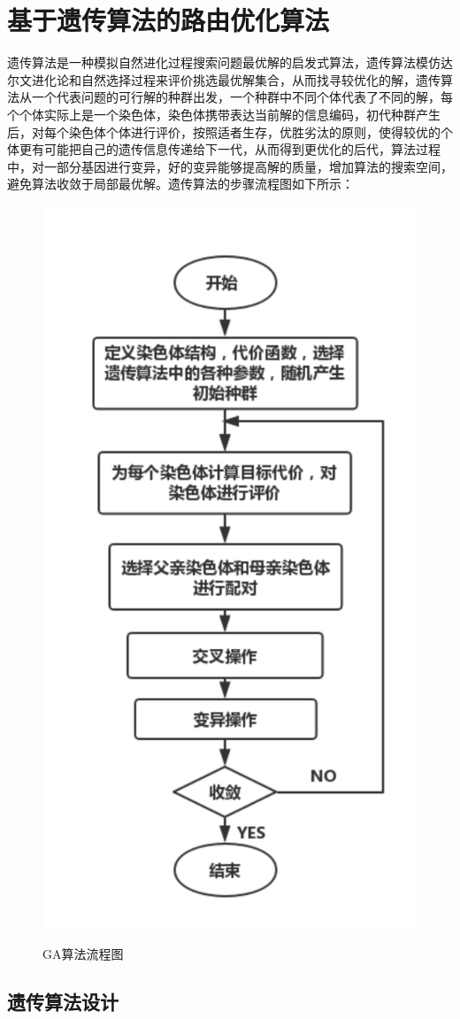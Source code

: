 \section{基于遗传算法的路由优化算法}
	遗传算法是一种模拟自然进化过程搜索问题最优解的启发式算法，遗传算法模仿达尔文进化论和自然选择过程来评价挑选最优解集合，从而找寻较优化的解，遗传算法从一个代表问题的可行解的种群出发，一个种群中不同个体代表了不同的解，每个个体实际上是一个染色体，染色体携带表达当前解的信息编码，初代种群产生后，对每个染色体个体进行评价，按照适者生存，优胜劣汰的原则，使得较优的个体更有可能把自己的遗传信息传递给下一代，从而得到更优化的后代，算法过程中，对一部分基因进行变异，好的变异能够提高解的质量，增加算法的搜索空间，避免算法收敛于局部最优解。遗传算法的步骤流程图如下所示：
\begin{figure}
\setlength{\belowcaptionskip}{-0.5cm}
  \begin{center}
    {\includegraphics[width=0.45 \textwidth]{figures/GAprocess.pdf}}
    \end{center}
  \caption{{\footnotesize{GA算法流程图}}}
  \label{IterNum}
\end{figure}
\subsection{遗传算法设计}
